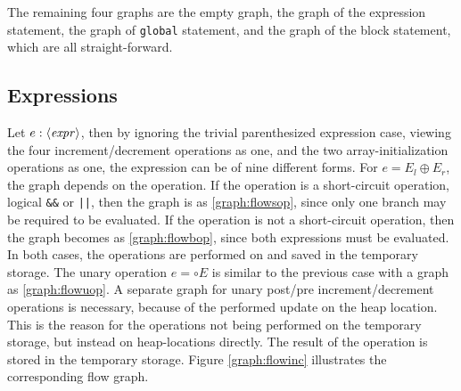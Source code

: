 The remaining four graphs are the empty graph, the graph of the expression statement, the graph of \texttt{global} statement, and the graph of the block statement, which are all straight-forward.


\subsection{Expressions}

Let $e : \langle\mathit{expr}\rangle$, then by ignoring the trivial parenthesized expression case, viewing the four increment/decrement operations as one, and the two array-initialization operations as one, the expression can be of nine different forms. For $e = E_l \oplus E_r$, the graph depends on the operation. If the operation is a short-circuit operation, logical \texttt{\&\&} or \texttt{||}, then the graph is as \ref{graph:flowsop}, since only one branch may be required to be evaluated. If the operation is not a short-circuit operation, then the graph becomes as \ref{graph:flowbop}, since both expressions must be evaluated. In both cases, the operations are performed on and saved in the temporary storage. The unary operation $e = \circ E$ is similar to the previous case with a graph as \ref{graph:flowuop}. A separate graph for unary post/pre increment/decrement operations is necessary, because of the performed update on the heap location. This is the reason for the operations not being performed on the temporary storage, but instead on heap-locations directly. The result of the operation is stored in the temporary storage. Figure \ref{graph:flowinc} illustrates the corresponding flow graph.
